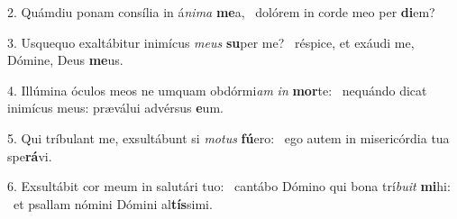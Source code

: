 2. Quámdiu ponam consília in á\textit{ni}\textit{ma} \textbf{me}a, \ast\  dolórem in corde meo per \textbf{di}em?\

3. Usquequo exaltábitur inimícus \textit{me}\textit{us} \textbf{su}per me? \ast\  réspice, et exáudi me, Dómine, Deus \textbf{me}us.\

4. Illúmina óculos meos ne umquam obdórmi\textit{am} \textit{in} \textbf{mor}te: \ast\  nequándo dicat inimícus meus: præválui advérsus \textbf{e}um.\

5. Qui tríbulant me, exsultábunt si \textit{mo}\textit{tus} \textbf{fú}ero: \ast\  ego autem in misericórdia tua spe\textbf{rá}vi.\

6. Exsultábit cor meum in salutári tuo: \dag\  cantábo Dómino qui bona trí\textit{bu}\textit{it} \textbf{mi}hi: \ast\  et psallam nómini Dómini al\textbf{tís}simi.\

